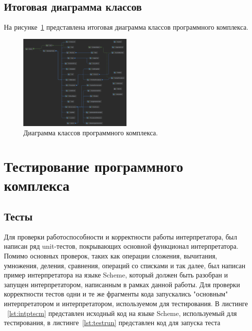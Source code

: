 \documentclass[14pt, russian]{scrartcl}
\begin{document}
\subsection{Итоговая диаграмма классов}

На рисунке~\ref{fig::diagram} представлена итоговая диаграмма классов программного комплекса.

\begin{figure}[!htb]\centering
\includegraphics[width=0.5\textwidth]{diagram.png}
\caption{Диаграмма классов программного комплекса.}
\label{fig::diagram}
\end{figure}

\section{Тестирование программного комплекса}

\subsection{Тесты}

Для проверки работоспособности и корректности работы интерпретатора, был написан ряд unit-тестов, покрывающих основной функционал интерпретатора.
Помимо основных проверок, таких как операции сложения, вычитания, умножения, деления, сравнения, операций со списками и так далее, был написан пример интерпретатора на языке Scheme, который должен быть разобран и запущен интерпретатором, написанным в рамках данной работы.
Для проверки корректности тестов одни и те же фрагменты кода запускались "основным" интерпретатором и интерпретатором, используемом для тестирования.
В листинге ~\ref{lst:intptscm} представлен исходный код на языке Scheme, используемый для тестирования, в листинге~\ref{lst:testrun} представлен код для запуска теста
\end{document}
